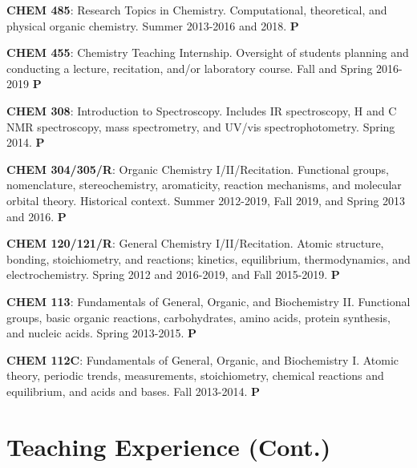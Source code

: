 \documentclass[10pt]{article}
\newcommand*\teitem[4]{\textbf{#1}: #2 #3 \textbf{#4}}
\begin{document}

\teitem{CHEM 485}{Research Topics in Chemistry. Computational, theoretical, and physical organic chemistry.}{Summer 2013-2016 and 2018.}{P}

\teitem{CHEM 455}{Chemistry Teaching Internship. Oversight of students planning and conducting a lecture, recitation, and/or laboratory course.}{Fall and Spring 2016-2019}{P}

\teitem{CHEM 308}{Introduction to Spectroscopy. Includes IR spectroscopy, \raisebox{1mm}{\scriptsize 1}H and \raisebox{1mm}{\scriptsize 13}C NMR spectroscopy, mass spectrometry, and UV/vis spectrophotometry.}{Spring 2014.}{P}

\teitem{CHEM 304/305/R}{Organic Chemistry I/II/Recitation. Functional groups, nomenclature, stereochemistry, aromaticity, reaction mechanisms, and molecular orbital theory. Historical context.}{Summer 2012-2019, Fall 2019, and Spring 2013 and 2016.}{P} 

\teitem{CHEM 120/121/R}{General Chemistry I/II/Recitation. Atomic structure, bonding, stoichiometry, and reactions; kinetics, equilibrium, thermodynamics, and electrochemistry.}{Spring 2012 and 2016-2019, and Fall 2015-2019.}{P}

\teitem{CHEM 113}{Fundamentals of General, Organic, and Biochemistry II. Functional groups, basic organic reactions, carbohydrates, amino acids, protein synthesis, and nucleic acids.}{Spring 2013-2015.}{P} 

\teitem{CHEM 112C}{Fundamentals of General, Organic, and Biochemistry I. Atomic theory, periodic trends, measurements, stoichiometry, chemical reactions and equilibrium, and acids and bases.}{Fall 2013-2014.}{P}


\section{Teaching Experience (Cont.)}
\end{document}
